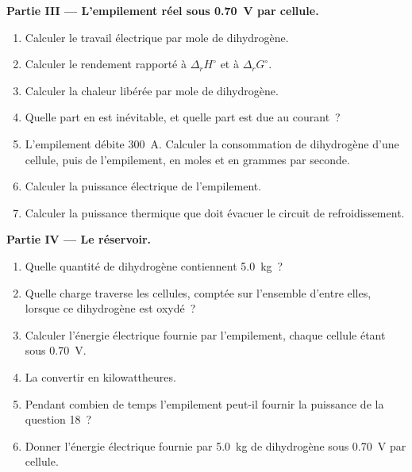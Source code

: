 \begin{problem}
\medskip
\noindent\textbf{Partie III --- L'empilement réel sous \qty{0.70}{V} par cellule.}
\begin{enumerate}[resume]
  \item Calculer le travail électrique par mole de dihydrogène.
  \item Calculer le rendement rapporté à $\Delta_r H^\circ$ et à $\Delta_r G^\circ$.
  \item Calculer la chaleur libérée par mole de dihydrogène.
  \item Quelle part en est inévitable, et quelle part est due au courant~?
  \item L'empilement débite \qty{300}{A}. Calculer la consommation de dihydrogène d'une
        cellule, puis de l'empilement, en moles et en grammes par seconde.
  \item Calculer la puissance électrique de l'empilement.
  \item Calculer la puissance thermique que doit évacuer le circuit de refroidissement.
\end{enumerate}

\medskip
\noindent\textbf{Partie IV --- Le réservoir.}
\begin{enumerate}[resume]
  \item Quelle quantité de dihydrogène contiennent \qty{5.0}{kg}~?
  \item Quelle charge traverse les cellules, comptée sur l'ensemble d'entre elles, lorsque
        ce dihydrogène est oxydé~?
  \item Calculer l'énergie électrique fournie par l'empilement, chaque cellule étant sous
        \qty{0.70}{V}.
  \item La convertir en kilowattheures.
  \item Pendant combien de temps l'empilement peut-il fournir la puissance de la question 18~?
  \item Donner l'énergie électrique fournie par \qty{5.0}{kg} de dihydrogène sous
        \qty{0.70}{V} par cellule.
\end{enumerate}
\end{problem}
